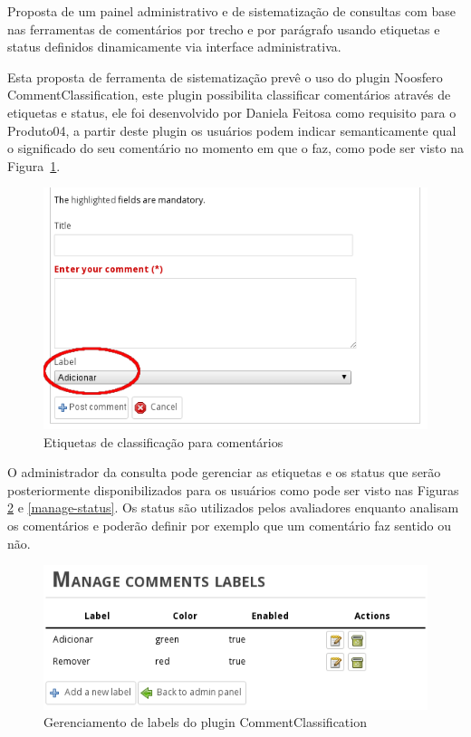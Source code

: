 \documentclass[12pt]{article}
\begin{document}
Proposta de um painel administrativo e de sistematização de consultas com base
nas ferramentas de comentários por trecho e por parágrafo usando etiquetas e
status definidos dinamicamente via interface administrativa.

Esta proposta de ferramenta de sistematização prevê o uso do plugin Noosfero
CommentClassification\cite{commentClassificationPlugin}, este plugin
possibilita classificar comentários através de etiquetas e status, ele foi
desenvolvido por Daniela Feitosa como requisito para o Produto04, a partir
deste plugin os usuários podem indicar semanticamente qual o significado do
seu comentário no momento em que o faz, como pode ser visto na
Figura~\ref{etiqueta}.

\begin{figure}[h]
\center
\includegraphics[scale=0.5]{etiqueta.png}
\caption{Etiquetas de classificação para comentários}
\label{etiqueta}
\end{figure}

O administrador da consulta pode gerenciar as etiquetas e os status que serão
posteriormente disponibilizados para os usuários como pode ser visto nas
Figuras \ref{manage-labels} e \ref{manage-status}. Os status são utilizados
pelos avaliadores enquanto analisam os comentários e poderão definir por
exemplo que um comentário faz sentido ou não.

\begin{figure}[h]
\center
\includegraphics[scale=0.5]{manage-labels.png}
\caption{Gerenciamento de labels do plugin CommentClassification}
\label{manage-labels}
\end{figure}
\end{document}
